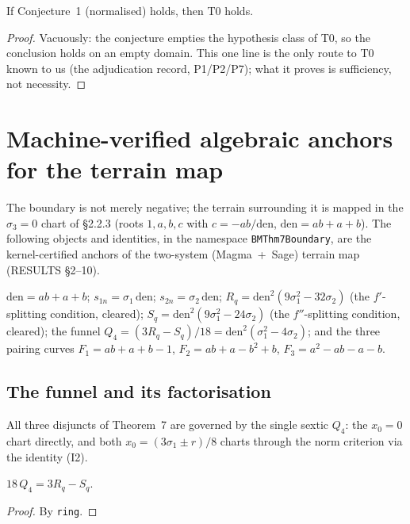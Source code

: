 \begin{theorem}\label{thm7_of_conjecture1}\leanok
{}
If Conjecture~1 (normalised) holds, then T0 holds.
\end{theorem}
\begin{proof}\leanok
{}
Vacuously: the conjecture empties the hypothesis class of T0, so the conclusion holds on
an empty domain.  This one line is the only route to T0 known to us (the adjudication record,
P1/P2/P7); what it proves is sufficiency, not necessity.
\end{proof}

\section{Machine-verified algebraic anchors for the terrain map}

The boundary is not merely negative; the terrain surrounding it is mapped in the
$\sigma_{3}=0$ chart of \S2.2.3 (roots $1,a,b,c$ with $c=-ab/\mathrm{den}$,
$\mathrm{den}=ab+a+b$).  The following objects and identities, in the namespace
\texttt{BMThm7Boundary}, are the kernel-certified anchors of the two-system
(Magma~+~Sage) terrain map (RESULTS \S2--10).

\begin{definition}\label{boundary-defs}\leanok
$\mathrm{den}=ab+a+b$; $s_{1n}=\sigma_{1}\,\mathrm{den}$; $s_{2n}=\sigma_{2}\,\mathrm{den}$;
$R_{q}=\mathrm{den}^{2}(9\sigma_{1}^{2}-32\sigma_{2})$ (the $f'$-splitting condition,
cleared); $S_{q}=\mathrm{den}^{2}(9\sigma_{1}^{2}-24\sigma_{2})$ (the $f''$-splitting
condition, cleared); the funnel $Q_{4}=(3R_{q}-S_{q})/18=\mathrm{den}^{2}(\sigma_{1}^{2}-4\sigma_{2})$;
and the three pairing curves $F_{1}=ab+a+b-1$, $F_{2}=ab+a-b^{2}+b$, $F_{3}=a^{2}-ab-a-b$.
\end{definition}

\subsection*{The funnel and its factorisation}

All three disjuncts of Theorem~7 are governed by the single sextic $Q_{4}$: the $x_{0}=0$
chart directly, and both $x_{0}=(3\sigma_{1}\pm r)/8$ charts through the norm criterion
via the identity (I2).

\begin{lemma}[I1, cleared]\label{I1_cleared}\leanok
{}
$18\,Q_{4}=3R_{q}-S_{q}$.
\end{lemma}
\begin{proof}\leanok
By \texttt{ring}.
\end{proof}

